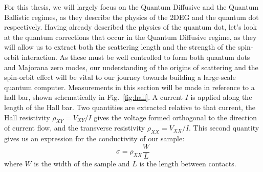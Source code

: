 For this thesis, we will largely focus on the Quantum Diffusive and the Quantum Ballistic regimes, as they describe the physics of the
2DEG and the quantum dot respectively. Having already described the physics of the quantum dot, let's look at the quantum corrections that occur
in the Quantum Diffusive regime, as they will allow us to extract both the scattering length and the strength of the spin-orbit
interaction. As these must be well controlled to form both quantum dots and Majorana zero modes, our understanding of the origins of
scattering and the spin-orbit effect will be vital to our journey towards building a large-scale quantum computer. Measurements in this section
will be made in reference to a hall bar, shown schematically in Fig.~\ref{fig:hall}. A current $I$ is applied along the length of the Hall bar.
Two quantities are extracted relative to that current, the Hall resistivity $\rho_{XY} = V_{XY}/I$ gives
the voltage formed orthogonal to the direction of current flow, and the transverse resistivity $\rho_{XX} = V_{XX}/I$.
This second quantity gives us an expression for the conductivity of our sample:
\begin{equation}
  \sigma = \rho_{XX} \frac{W}{L}
\end{equation}
where $W$ is the width of the sample and $L$ is the length between contacts.

